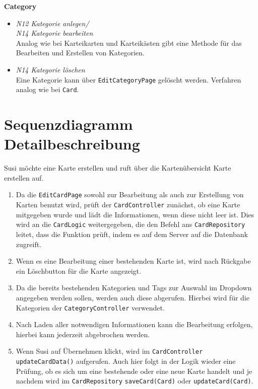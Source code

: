 \documentclass[fontsize=12pt,paper=A4,twoside]{scrartcl}
\begin{document}
    \newpage
    \textbf{\large Category}
    \begin{itemize}
        \item \textit{N12 Kategorie anlegen/ \\
         N14 Kategorie bearbeiten}\\
    Analog wie bei Karteikarten und Karteikästen gibt eine Methode für das Bearbeiten und Erstellen von Kategorien.
        \item \textit{N14 Kategorie löschen}\\
    Eine Kategorie kann über \texttt{EditCategoryPage} gelöscht werden. Verfahren analog wie bei \texttt{Card}.
    \end{itemize}

    \clearpage
    \section{Sequenzdiagramm Detailbeschreibung}
    Susi möchte eine Karte erstellen und ruft über die Kartenübersicht Karte erstellen auf.
    \begin{enumerate}
    \item Da die \texttt{EditCardPage} sowohl zur Bearbeitung als auch zur Erstellung von Karten benutzt wird, prüft der \texttt{CardController}
    zunächst, ob eine Karte mitgegeben wurde und lädt die Informationen, wenn diese nicht leer ist. Dies wird an die \texttt{CardLogic} weitergegeben, die 
    den Befehl ans \texttt{CardRepository} leitet, dass die Funktion prüft, indem es auf dem Server auf die Datenbank zugreift.
    \item Wenn es eine Bearbeitung einer bestehenden Karte ist, wird nach Rückgabe ein Löschbutton für die Karte angezeigt.
    \item Da die bereits bestehenden Kategorien und Tags zur Auswahl im Dropdown angegeben werden sollen, werden auch diese abgerufen.
    Hierbei wird für die Kategorien der \texttt{CategoryController} verwendet.
    \item Nach Laden aller notwendigen Informationen kann die Bearbeitung erfolgen, hierbei kann jederzeit abgebrochen werden.
    \item Wenn Susi auf Übernehmen klickt, wird im \texttt{CardController} \texttt{updateCardData()} aufgerufen. Auch hier folgt
    in der Logik wieder eine Prüfung, ob es sich um eine bestehende oder eine neue Karte handelt und je nachdem wird im \texttt{CardRepository}
    \texttt{saveCard(Card)} oder \texttt{updateCard(Card)}.
    \end{enumerate}
\end{document}

